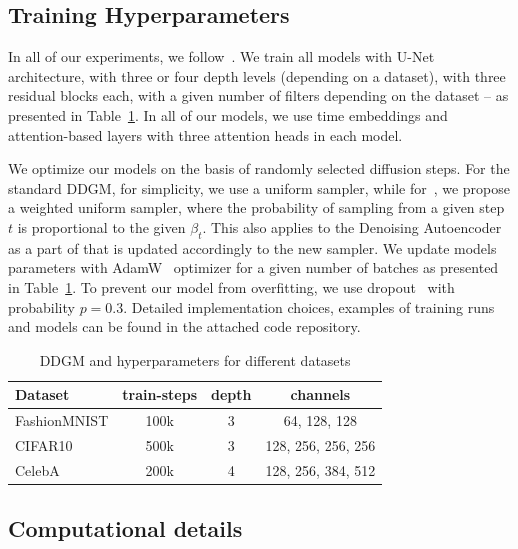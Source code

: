 \newpage
\subsection{Training Hyperparameters}\label{appx:hyperparams}
In all of our experiments, we follow~\cite{nichol2021improved}. We train all models with U-Net architecture, with three or four depth levels (depending on a dataset), with three residual blocks each, with a given number of filters depending on the dataset -- as presented in Table~\ref{tab:hyperparams}. In all of our models, we use time embeddings and attention-based layers with three attention heads in each model.

We optimize our models on the basis of randomly selected diffusion steps. For the standard DDGM, for simplicity, we use a uniform sampler, while for~\ours{}, we propose a weighted uniform sampler, where the probability of sampling from a given step $t$ is proportional to the given $\beta_t$. This also applies to the Denoising Autoencoder as a part of \ours{} that is updated accordingly to the new sampler. We update models parameters with AdamW~\cite{loshchilov2017decoupled} optimizer for a given number of batches as presented in Table~\ref{tab:hyperparams}. To prevent our model from overfitting, we use dropout~\cite{hinton2012improving} with probability $p=0.3$. Detailed implementation choices, examples of training runs and models can be found in the attached code repository.

\begin{table}[h]
  \centering
  \caption{DDGM and \ours{} hyperparameters for different datasets
}
  \label{tab:hyperparams}
  \begin{tabular}{l||ccc}
    \toprule
     Dataset & train-steps & depth & channels\\
     
    \midrule
    FashionMNIST & 100k & 3 & 64, 128, 128 \\
    CIFAR10 & 500k & 3 & 128, 256, 256, 256 \\
    CelebA & 200k & 4 & 128, 256, 384, 512\\

    \bottomrule
  \end{tabular}
		\vspace*{2\baselineskip}
\end{table}

\subsection{Computational details}

